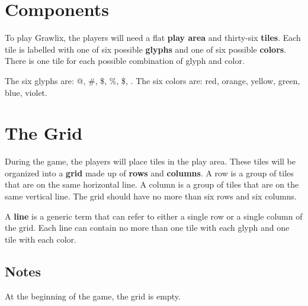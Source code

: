 \documentclass[a4paper, 10pt, notumble]{leaflet}
\makeatletter
\newcommand{\smallat}{{\setmainfont{Comic Neue-Bold} \Large @}}
\newcommand{\smallpound}{{\setmainfont{Comic Neue-Bold} \large \#}}
\newcommand{\smalldollar}{{\setmainfont{Comic Neue-Bold} \large \$}}
\newcommand{\smallpercent}{{\setmainfont{Comic Neue-Bold} \large \%}}
\newcommand{\smallampersand}{{\setmainfont{Comic Neue-Bold} \large \$}}
\newcommand{\smallasterisk}{{\setmainfont{Quicksand-Bold} \Huge \raisebox{-0.25ex}{\textasteriskcentered{}}}}
\makeatother
\begin{document}
\section{Components}
To play Grawlix, the players will need a flat \textbf{play area} and thirty-six \textbf{tiles}. Each tile is labelled with one of six possible \textbf{glyphs} and one of six possible \textbf{colors}.  There is one tile for each possible combination of glyph and color.

The six glyphs are: \smallat, \smallpound, \smalldollar, \smallpercent, \smallampersand, \smallasterisk. The six colors are: red, orange, yellow, green, blue, violet.

\begin{figure}[h]
\centering
{}

\end{figure}

\newpage

\section{The Grid}
During the game, the players will place tiles in the play area. These tiles will be organized into a \textbf{grid} made up of \textbf{rows} and \textbf{columns}. A row is a group of tiles that are on the same horizontal line.  A column is a group of tiles that are on the same vertical line. The grid should have no more than six rows and six columns.

A \textbf{line} is a generic term that can refer to either a single row or a single column of the grid. Each line can contain no more than one tile with each glyph and one tile with each color.

\subsection{Notes}
At the beginning of the game, the grid is empty.
\end{document}
